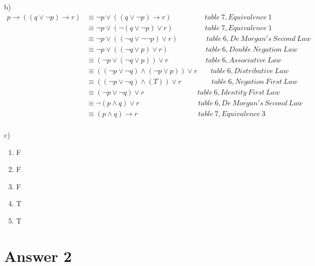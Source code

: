 \documentclass[12pt]{article}
\begin{document}
b)\\
\begin{equation*}
\begin{split}
 p \rightarrow ((q \vee \neg p) \rightarrow r) &
 \equiv \neg p \vee ((q \vee \neg p) \rightarrow r)\  \ \qquad \quad\quad \ table\ 7, Equivalence \ 1\\
 &
 \equiv \neg p \vee (\neg(q \vee \neg p) \vee r)\ \  \quad \quad \quad\quad table\ 7, Equivalence\ 1\\
 &
 \equiv \neg p \vee ((\neg q \vee \neg \neg p) \vee r) \quad \quad\quad \quad  table\ 6, De\ Morgan's\ Second\ Law\\ &
 \equiv \neg p \vee ((\neg q \vee  p) \vee r) \quad \quad \quad \quad\quad\ table\ 6, Double\  Negation\ Law\\ &
 \equiv (\neg p \vee (\neg q \vee  p)) \vee r \quad \quad \quad \quad\quad\ table\ 6, Associative\ Law\\ &
 \equiv ((\neg p \vee \neg q) \wedge(\neg p  \vee  p)) \vee r \quad \ \ \ \  table\ 6, Distributive \ Law\\ &
 \equiv ((\neg p \vee \neg q) \wedge(T)) \vee r \quad \quad \quad \quad \ table\ 6, Negation \ First \ Law\\ &
 \equiv (\neg p \vee \neg q)  \vee r \quad \quad \quad\quad\quad\quad\quad\ \ table\ 6, Identity\ First\ Law\\ &
 \equiv \neg( p \wedge  q)  \vee r \quad \quad \quad \quad\quad\quad\quad\quad\ table\ 6, De\ Morgan's\ Second\ Law\\ &
 \equiv ( p \wedge  q)  \rightarrow r \quad \quad \quad \quad\quad\quad\quad\quad \ \ table\ 7, Equivalence\ 3\\
\end{split}
\end{equation*}

c)\\


\begin{enumerate}
\centering
    \item F
    \item F
    \item F
    \item T
    \item T
\end{enumerate}

\section*{Answer 2}
\end{document}

